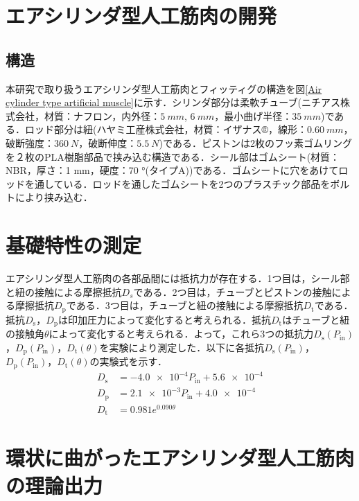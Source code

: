 \section{エアシリンダ型人工筋肉の開発}%
\subsection{構造}%
本研究で取り扱うエアシリンダ型人工筋肉とフィッティグの構造を図\ref{Air cylinder type artificial muscle}に示す．シリンダ部分は柔軟チューブ(ニチアス株式会社，材質：ナフロン\textregistered，内外径：$\SI{5}{mm}$, $\SI{6}{mm}$，最小曲げ半径：$\SI{35}{mm}$)である．ロッド部分は紐(ハヤミ工産株式会社，材質：イザナス®，線形：$\SI{0.60}{mm}$，破断強度：$\SI{360}{N}$，破断伸度：$\SI{5.5}{N}$)である．ピストンは2枚のフッ素ゴムリングを２枚のPLA樹脂部品で挟み込む構造である．シール部はゴムシート(材質：NBR，厚さ：1 mm，硬度：70 °(タイプA))である．ゴムシートに穴をあけてロッドを通している．ロッドを通したゴムシートを2つのプラスチック部品をボルトにより挟み込む．

\section{基礎特性の測定}%
エアシリンダ型人工筋肉の各部品間には抵抗力が存在する．1つ目は，シール部と紐の接触による摩擦抵抗$D_s$である．2つ目は，チューブとピストンの接触による摩擦抵抗$D_\mathrm{p}$である．3つ目は，チューブと紐の接触による摩擦抵抗$D_\mathrm{t}$である．抵抗$D_\mathrm{s}$，$D_\mathrm{p}$は印加圧力によって変化すると考えられる．抵抗$D_\mathrm{t}$はチューブと紐の接触角$\theta$によって変化すると考えられる．よって，これら3つの抵抗力$D_\mathrm{s}(P_\mathrm{in})$，$D_\mathrm{p}(P_\mathrm{in})$，$D_\mathrm{t}(\theta)$を実験により測定した．以下に各抵抗$D_\mathrm{s}(P_\mathrm{in})$，$D_\mathrm{p}(P_\mathrm{in})$，$D_\mathrm{t}(\theta)$の実験式を示す．
\begin{align}
  D_\mathrm{s} & = \num{-4.0e-4}P_\mathrm{in} + \num{5.6e-4} \\
  D_\mathrm{p} & = \num{2.1e-3}P_\mathrm{in} + \num{4.0e-4}  \\
  D_\mathrm{t} & = 0.981e^{0.090\theta}
\end{align}


\section{環状に曲がったエアシリンダ型人工筋肉の理論出力}%
